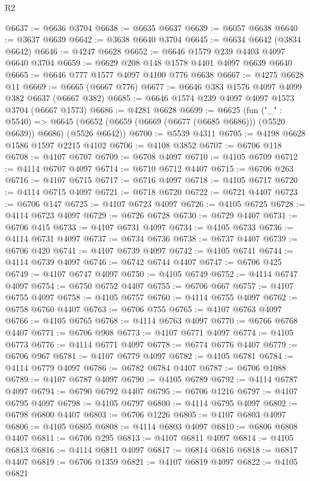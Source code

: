\begin{lexlean}{R2}
\begin{coremodule}
@6637 := @6636 @3704
@6638 := @6635 @6637
@6639 := @6057 @6638
@6640 := @3637 @6639
@6642 := @3638 @6640 @3704
@6645 := @6634 @6642 (@3834 @6642)
@6646 := @4247 @6628
@6652 := @6646 @1579 @239 @4403 @4097 @6640 @3704
@6659 := @6629 @208 @148 @1578 @4401 @4097 @6639 @6640
@6665 := @6646 @777 @1577 @4097 @4100 @776 @6638
@6667 := @4275 @6628 @11
@6669 := @6665 (@6667 @776)
@6677 := @6646 @383 @1576 @4097 @4099 @382 @6637 (@6667 @382)
@6685 := @6646 @1574 @239 @4097 @4097 @1573 @3704 (@6667 @1573)
@6686 := @4281 @6628
@6699 := @6625
    (fun ("_" : @5540) =>
    @6645 (@6652 (@6659 (@6669 (@6677 (@6685 @6686))) (@5520 @6639)) @6686) (@5526 @6642))
@6700 := @5539 @4311
@6705 := @4198 @6628 @1586 @1597 @2215 @4102
@6706 := @4108 @3852
@6707 := @6706 @118
@6708 := @4107 @6707
@6709 := @6708 @4097
@6710 := @4105 @6709
@6712 := @4114 @6707 @4097
@6714 := @6710 @6712 @4407
@6715 := @6706 @263
@6716 := @4107 @6715
@6717 := @6716 @4097
@6718 := @4105 @6717
@6720 := @4114 @6715 @4097
@6721 := @6718 @6720
@6722 := @6721 @4407
@6723 := @6706 @147
@6725 := @4107 @6723 @4097
@6726 := @4105 @6725
@6728 := @4114 @6723 @4097
@6729 := @6726 @6728
@6730 := @6729 @4407
@6731 := @6706 @415
@6733 := @4107 @6731 @4097
@6734 := @4105 @6733
@6736 := @4114 @6731 @4097
@6737 := @6734 @6736
@6738 := @6737 @4407
@6739 := @6706 @420
@6741 := @4107 @6739 @4097
@6742 := @4105 @6741
@6744 := @4114 @6739 @4097
@6746 := @6742 @6744 @4407
@6747 := @6706 @425
@6749 := @4107 @6747 @4097
@6750 := @4105 @6749
@6752 := @4114 @6747 @4097
@6754 := @6750 @6752 @4407
@6755 := @6706 @667
@6757 := @4107 @6755 @4097
@6758 := @4105 @6757
@6760 := @4114 @6755 @4097
@6762 := @6758 @6760 @4407
@6763 := @6706 @755
@6765 := @4107 @6763 @4097
@6766 := @4105 @6765
@6768 := @4114 @6763 @4097
@6770 := @6766 @6768 @4407
@6771 := @6706 @908
@6773 := @4107 @6771 @4097
@6774 := @4105 @6773
@6776 := @4114 @6771 @4097
@6778 := @6774 @6776 @4407
@6779 := @6706 @967
@6781 := @4107 @6779 @4097
@6782 := @4105 @6781
@6784 := @4114 @6779 @4097
@6786 := @6782 @6784 @4407
@6787 := @6706 @1088
@6789 := @4107 @6787 @4097
@6790 := @4105 @6789
@6792 := @4114 @6787 @4097
@6794 := @6790 @6792 @4407
@6795 := @6706 @1216
@6797 := @4107 @6795 @4097
@6798 := @4105 @6797
@6800 := @4114 @6795 @4097
@6802 := @6798 @6800 @4407
@6803 := @6706 @1226
@6805 := @4107 @6803 @4097
@6806 := @4105 @6805
@6808 := @4114 @6803 @4097
@6810 := @6806 @6808 @4407
@6811 := @6706 @295
@6813 := @4107 @6811 @4097
@6814 := @4105 @6813
@6816 := @4114 @6811 @4097
@6817 := @6814 @6816
@6818 := @6817 @4407
@6819 := @6706 @1359
@6821 := @4107 @6819 @4097
@6822 := @4105 @6821

\end{coremodule}
\end{lexlean}

